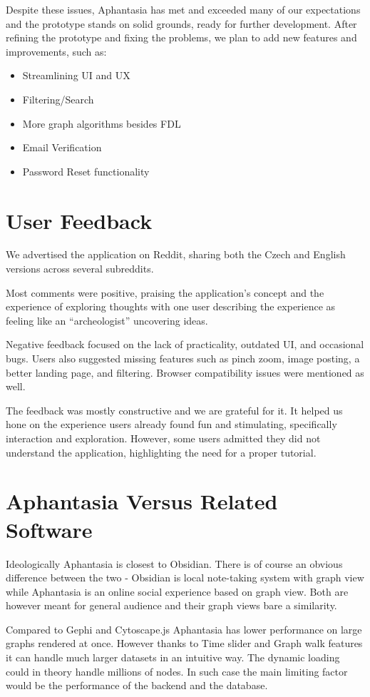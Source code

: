 Despite these issues, Aphantasia has met and exceeded many of our expectations and the prototype stands on solid grounds, ready for further development.
After refining the prototype and fixing the problems, we plan to add new features and improvements, such as:
\begin{itemize}
\item Streamlining UI and UX
\item Filtering/Search
\item More graph algorithms besides \gls{FDL}
\item Email Verification
\item Password Reset functionality
\end{itemize}

\section{User Feedback}
We advertised the application on Reddit, sharing both the Czech and English versions across several subreddits.

Most comments were positive, praising the application’s concept and the experience of exploring thoughts
with one user describing the experience as feeling like an “archeologist” uncovering ideas. 

Negative feedback focused on the lack of practicality, outdated UI, and occasional bugs.
Users also suggested missing features such as pinch zoom, image posting, a better landing page, and filtering.
Browser compatibility issues were mentioned as well.

The feedback was mostly constructive and we are grateful for it.
It helped us hone on the experience users already found fun and stimulating, specifically interaction and exploration.
However, some users admitted they did not understand the application, highlighting the need for a proper tutorial.

\section{Aphantasia Versus Related Software}

Ideologically Aphantasia is closest to Obsidian.
There is of course an obvious difference between the two - Obsidian is local note-taking system with graph view while Aphantasia is an online social experience based on graph view.
Both are however meant for general audience and their graph views bare a similarity.

Compared to Gephi and Cytoscape.js Aphantasia has lower performance on large graphs rendered at once.
However thanks to Time slider and Graph walk features it can handle much larger datasets in an intuitive way.
The dynamic loading could in theory handle millions of nodes. In such case the main limiting factor would be the performance of the backend and the database.

